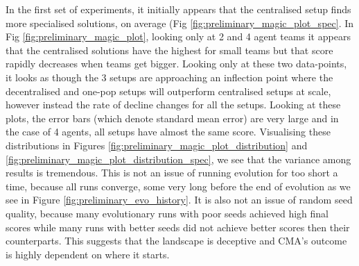 \documentclass[12pt]{article}
\begin{document}
In the first set of experiments, it initially appears that the centralised setup finds more specialised solutions, on average (Fig \ref{fig:preliminary_magic_plot_spec}.
In Fig \ref{fig:preliminary_magic_plot}, looking only at 2 and 4 agent teams it appears that the centralised solutions have the highest for small teams but that score rapidly decreases when teams get bigger.
Looking only at these two data-points, it looks as though the 3 setups are approaching an inflection point where the decentralised and one-pop setups will outperform centralised setups at scale, however instead the rate of decline changes for all the setups.
Looking at these plots, the error bars (which denote standard mean error) are very large and in the case of 4 agents, all setups have almost the same score.
Visualising these distributions in Figures \ref{fig:preliminary_magic_plot_distribution} and \ref{fig:preliminary_magic_plot_distribution_spec}, we see that the variance among results is tremendous.
This is not an issue of running evolution for too short a time, because all runs converge, some very long before the end of evolution as we see in Figure \ref{fig:preliminary_evo_history}.
It is also not an issue of random seed quality, because many evolutionary runs with poor seeds achieved high final scores while many runs with better seeds did not achieve better scores then their counterparts.
This suggests that the landscape is deceptive and CMA's outcome is highly dependent on where it starts.\\
\end{document}
